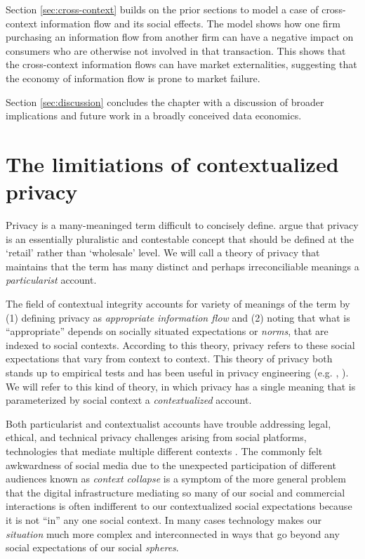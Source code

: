 \documentclass[../thesis.tex]{subfiles}
\begin{document}
Section \ref{sec:cross-context} builds on the prior
sections to model a case of cross-context information
flow and its social effects.
The model shows how one firm purchasing an information
flow from another firm can have a negative impact
on consumers who are otherwise not involved in that
transaction.
This shows that the cross-context information flows
can have market externalities, suggesting that
the economy of information flow is prone to market failure.

Section \ref{sec:discussion} concludes the chapter
with a discussion of broader implications and future
work in a broadly conceived data economics.

\section{The limitiations of contextualized privacy}
\label{sec:limitations}

Privacy is a many-meaninged term
difficult \cite{solove2005taxonomy} to concisely define.
\citet{mulligan2016privacy} argue that privacy is an
essentially pluralistic and contestable
concept that should be defined at the `retail' rather
than `wholesale' level.
We will call a theory of privacy that maintains
that the term has many distinct and perhaps irreconciliable
meanings a \emph{particularist} account.

The field of contextual integrity \cite{nissenbaum09book}
accounts for variety of meanings of the term by
(1) defining privacy
as \emph{appropriate information flow} and
(2) noting
that what is ``appropriate'' depends on socially situated
expectations or \emph{norms}, that are indexed to social
contexts.
According to this theory, privacy refers to these
social expectations that vary from context
to context.
This theory of privacy both stands up to empirical tests
\cite{martin2016measuring} and has been useful in
privacy engineering (e.g. \cite{shvartzshnaider2016learning},
\cite{benthall2017contextual}).
We will refer to this kind of theory, in which
privacy has a single meaning that is parameterized
by social context a \emph{contextualized} account.

Both particularist and contextualist accounts have trouble addressing legal,
ethical, and technical privacy challenges arising from
social platforms, technologies
that mediate multiple different contexts
\cite{benthall2017contextual}.
The commonly felt awkwardness of social media due to
the unexpected participation of different audiences
known as \emph{context collapse}
\cite{marwick2011tweet} \cite{davis2014context}
is a symptom of the more general problem
that the digital infrastructure mediating so many
of our social and commercial interactions
is often indifferent to our contextualized social
expectations because it is not ``in'' any one
social context.
In many cases technology makes our \emph{situation}
much more complex and interconnected in ways that
go beyond any social expectations of our social
\emph{spheres}.
\end{document}
